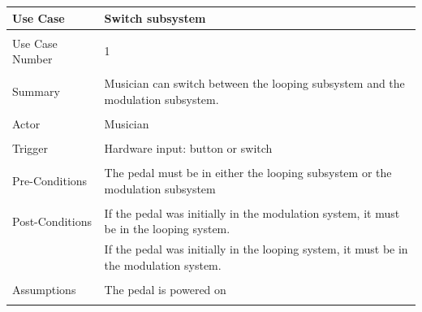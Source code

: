         \begin{table}[!ht]
            \centering
            \begin{tabular}{ l l  }
                Use Case & Switch subsystem  \\
                \hline \\
                Use Case Number & 1 \\ \\
                Summary & Musician can switch between the looping subsystem and the modulation subsystem. \\ \\
                Actor & Musician \\ \\
                Trigger & Hardware input: button or switch \\ \\
                
                Pre-Conditions & The pedal must be in either the looping subsystem or the modulation subsystem  \\ \\
                Post-Conditions & If the pedal was initially in the modulation system, it must be in the looping system. \\ 
                & If the pedal was initially in the looping system, it must be in the modulation system. \\ \\
                Assumptions & The pedal is powered on \\ \\
            \end{tabular}
        \end{table}
    
        \clearpage
